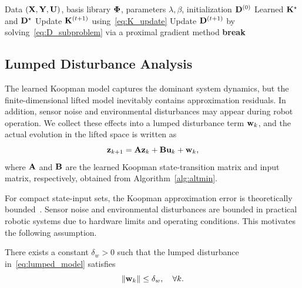 \begin{algorithm}[htbp]
\caption{Feature-Selection BCD Algorithm}
\label{alg:altmin}
\begin{algorithmic}[1]
\REQUIRE Data $(\mathbf{X},\mathbf{Y},\mathbf{U})$, basis library $\boldsymbol{\Phi}$, parameters $\lambda,\beta$, initialization $\mathbf{D}^{(0)}$
\ENSURE Learned $\mathbf{K}^\star$ and $\mathbf{D}^\star$
    \STATE Update $\mathbf{K}^{(t+1)}$ using~\eqref{eq:K_update}
    \STATE Update $\mathbf{D}^{(t+1)}$ by solving~\eqref{eq:D_subproblem} via a proximal gradient method
        \STATE \textbf{break}
    \ENDIF
\ENDFOR
\end{algorithmic}
\end{algorithm}

\subsection{Lumped Disturbance Analysis}
\label{subsec:error_quantification}

The learned Koopman model captures the dominant system dynamics, but the finite-dimensional lifted model inevitably contains approximation residuals. In addition, sensor noise and environmental disturbances may appear during robot operation. We collect these effects into a lumped disturbance term $\mathbf{w}_k$, and the actual evolution in the lifted space is written as
\begin{equation}
\label{eq:lumped_model}
\mathbf{z}_{k+1} = \mathbf{A}\mathbf{z}_k + \mathbf{B}\mathbf{u}_k + \mathbf{w}_k,
\end{equation}
where $\mathbf{A}$ and $\mathbf{B}$ are the learned Koopman state-transition matrix and input matrix, respectively, obtained from Algorithm~\ref{alg:altmin}.

For compact state-input sets, the Koopman approximation error is theoretically bounded~\cite{Korda2018MPC}. Sensor noise and environmental disturbances are bounded in practical robotic systems due to hardware limits and operating conditions. This motivates the following assumption.

{
\begin{assumption}
\label{assump:bounded_disturbance}
There exists a constant $\delta_w>0$ such that the lumped disturbance in~\eqref{eq:lumped_model} satisfies
\begin{equation}
\|\mathbf{w}_k\| \le \delta_w, \quad \forall k.
\end{equation}
\end{assumption}
}

